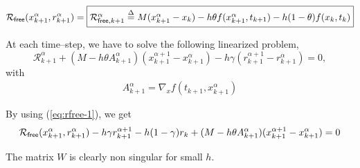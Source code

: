 \[  \mathcal R
_{{\sf free}}(x^{\alpha}_{k+1},r^{\alpha}_{k+1} )=\fbox{$ \mathcal R _{{\sf free}, k+1} ^{\alpha} \stackrel{\Delta}{=}  M(x^{\alpha}_{k+1} - x_{k}) -h\theta f( x^{\alpha}_{k+1} , t_{k+1}) - h(1-\theta)f(x_k,t_k)$}\]

At each time--step, we have to solve the following linearized problem,
\begin{equation}
   \label{eq:NL10}
    \mathcal R^{\alpha}_{k+1} + (M-h\theta A ^{\alpha}_{k+1}) (x^{\alpha+1}_{k+1} -
    x^{\alpha}_{k+1}) - h \gamma (r^{\alpha+1}_{k+1} - r^{\alpha}_{k+1} )  =0 ,
\end{equation}
with
\begin{equation}
     \begin{array}{l}
       A^{\alpha}_{k+1} = \nabla_x f(t_{k+1}, x^{\alpha}_{k+1})
 \end{array}
\end{equation}

By using (\ref{eq:rfree-1}), we get
\begin{equation}
  \label{eq:rfree-2}
  \mathcal R
_{{\sf free}}(x^{\alpha}_{k+1},r^{\alpha}_{k+1} )  - h\gamma r^{\alpha+1}_{k+1} - h(1-\gamma)r_k  + (M-h\theta A^{\alpha}_{k+1}) (x^{\alpha+1}_{k+1} -
    x^{\alpha}_{k+1})  =0
\end{equation}


The matrix $W$ is clearly non singular for small $h$.




